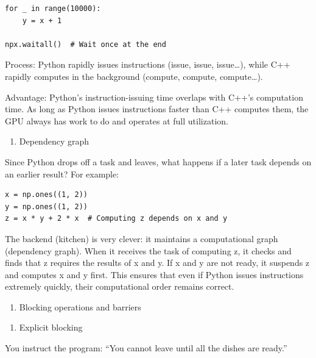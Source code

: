 \begin{verbatim}
for _ in range(10000):
    y = x + 1

npx.waitall()  # Wait once at the end
\end{verbatim}

Process: Python rapidly issues instructions (issue, issue, issue\ldots), while C++ rapidly computes in the background (compute, compute, compute\ldots).

Advantage: Python's instruction-issuing time overlaps with C++'s computation time. As long as Python issues instructions faster than C++ computes them, the GPU always has work to do and operates at full utilization.

\begin{enumerate}
\def\labelenumi{\arabic{enumi}.}
\setcounter{enumi}{2}
\tightlist
\item
  Dependency graph
\end{enumerate}

Since Python drops off a task and leaves, what happens if a later task depends on an earlier result? For example:

\begin{verbatim}
x = np.ones((1, 2))
y = np.ones((1, 2))
z = x * y + 2 * x  # Computing z depends on x and y
\end{verbatim}

The backend (kitchen) is very clever: it maintains a computational graph (dependency graph). When it receives the task of computing z, it checks and finds that z requires the results of x and y. If x and y are not ready, it suspends z and computes x and y first. This ensures that even if Python issues instructions extremely quickly, their computational order remains correct.

\begin{enumerate}
\def\labelenumi{\arabic{enumi}.}
\setcounter{enumi}{3}
\tightlist
\item
  Blocking operations and barriers
\end{enumerate}

\begin{enumerate}
\def\labelenumi{(\arabic{enumi})}
\tightlist
\item
  Explicit blocking
\end{enumerate}

You instruct the program: ``You cannot leave until all the dishes are ready.''


